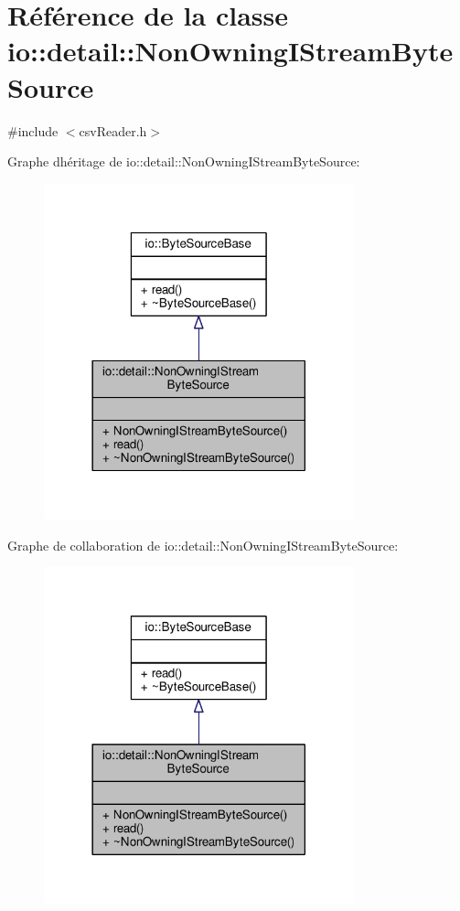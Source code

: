 \hypertarget{classio_1_1detail_1_1NonOwningIStreamByteSource}{}\section{Référence de la classe io\+:\+:detail\+:\+:Non\+Owning\+I\+Stream\+Byte\+Source}
\label{classio_1_1detail_1_1NonOwningIStreamByteSource}


{\ttfamily \#include $<$csv\+Reader.\+h$>$}



Graphe d\textquotesingle{}héritage de io\+:\+:detail\+:\+:Non\+Owning\+I\+Stream\+Byte\+Source\+:
\nopagebreak
\begin{figure}[H]
\begin{center}
\leavevmode
\includegraphics[width=254pt]{classio_1_1detail_1_1NonOwningIStreamByteSource__inherit__graph}
\end{center}
\end{figure}


Graphe de collaboration de io\+:\+:detail\+:\+:Non\+Owning\+I\+Stream\+Byte\+Source\+:
\nopagebreak
\begin{figure}[H]
\begin{center}
\leavevmode
\includegraphics[width=254pt]{classio_1_1detail_1_1NonOwningIStreamByteSource__coll__graph}
\end{center}
\end{figure}

